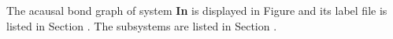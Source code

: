 

   The acausal bond graph of system \textbf{In} is
   displayed in Figure  and its label
   file is listed in Section .
   The subsystems are listed in Section .
